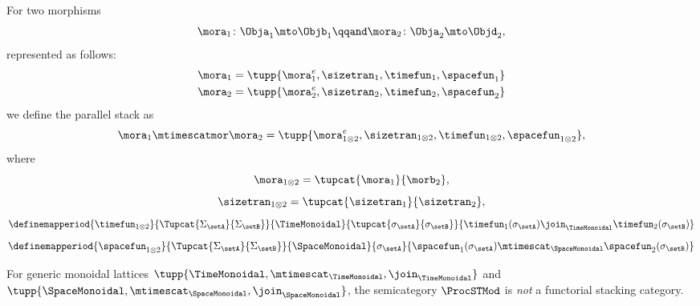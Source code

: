 \begin{lemma}
    For two morphisms
    \begin{equation}
        \mora_1 \colon \Obja_1 \mto \Objb_1
        \qqand
        \mora_2 \colon \Obja_2 \mto \Objd_2,
    \end{equation}
    represented as follows:
    \begin{align}
        \mora_1    &= \tupp{\mora^e_1, \sizetran_1,  \timefun_1,
        \spacefun_{1}  } \\
        \mora_2   &= \tupp{\mora^e_2, \sizetran_2,  \timefun_2, \spacefun_{2} }
    \end{align}
    we define the parallel stack as
    \begin{equation}
        \mora_1 \mtimescatmor \mora_2 = \tupp{
            \mora^e_{1\otimes2},
            \sizetran_{1\otimes2},
             \timefun_{1\otimes2},
             \spacefun_{1\otimes2}
        },
    \end{equation}
    where
    \begin{equation}
        \mora_{1\otimes2} = \tupcat {\mora_1}  {\morb_2},
    \end{equation}
    \begin{equation}
        \sizetran_{1\otimes2} =  \tupcat {\sizetran_1}  {\sizetran_2},
    \end{equation}
    \begin{equation}
        \definemapperiod{
            \timefun_{1\otimes 2}
        }{
            \Tupcat {\Sigma_{\setA}} {\Sigma_{\setB}}
        }{
            \TimeMonoidal
        }{
            \tupcat {\sigma_{\setA}} {\sigma_{\setB}}
        }{
            \timefun_1(\sigma_{\setA}) \join_{\TimeMonoidal} \timefun_2(\sigma_{\setB})
        }
    \end{equation}
    \begin{equation}
        \definemapperiod{
            \spacefun_{1\otimes2}
        }{
            \Tupcat {\Sigma_{\setA}} {\Sigma_{\setB}}
        }{
            \SpaceMonoidal
        }{
            \sigma_{\setA}
        }{
            \spacefun_1(\sigma_{\setA}) \mtimescat_{\SpaceMonoidal} \spacefun_2(\sigma_{\setB})
        }
    \end{equation}
\end{lemma}


\begin{lemma}
    For generic monoidal lattices $\tupp{\TimeMonoidal, \mtimescat_{\TimeMonoidal}, \join_{\TimeMonoidal}}$ and $\tupp{\SpaceMonoidal, \mtimescat_{\SpaceMonoidal}, \join_{\SpaceMonoidal}}$, the semicategory $\ProcSTMod$  is \emph{not} a functorial stacking category.
\end{lemma}


